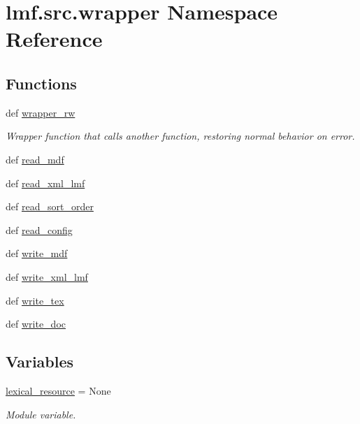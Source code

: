 \hypertarget{namespacelmf_1_1src_1_1wrapper}{\section{lmf.\+src.\+wrapper Namespace Reference}
\label{namespacelmf_1_1src_1_1wrapper}
}
\subsection*{Functions}
\begin{DoxyCompactItemize}
\item 
def \hyperlink{namespacelmf_1_1src_1_1wrapper_a3452144e50e7d9906a4fb68f16338147}{wrapper\+\_\+rw}
\begin{DoxyCompactList}\small\item\em Wrapper function that calls another function, restoring normal behavior on error. \end{DoxyCompactList}\item 
def \hyperlink{namespacelmf_1_1src_1_1wrapper_ac9330e43238a9e7374fec44248dccb9b}{read\+\_\+mdf}
\item 
def \hyperlink{namespacelmf_1_1src_1_1wrapper_a43689b5d5e59354412e8419b55cad753}{read\+\_\+xml\+\_\+lmf}
\item 
def \hyperlink{namespacelmf_1_1src_1_1wrapper_ae26ce96b85e0bd54d99d77674a330f08}{read\+\_\+sort\+\_\+order}
\item 
def \hyperlink{namespacelmf_1_1src_1_1wrapper_a8f281516c56b0837c0a0138ee87c4e7c}{read\+\_\+config}
\item 
def \hyperlink{namespacelmf_1_1src_1_1wrapper_a34eb45bde89039fab69e6f323c64b61b}{write\+\_\+mdf}
\item 
def \hyperlink{namespacelmf_1_1src_1_1wrapper_a21e10a1783a71a179ca395a1ffbf7124}{write\+\_\+xml\+\_\+lmf}
\item 
def \hyperlink{namespacelmf_1_1src_1_1wrapper_ac819224ea6166cfc937077700ec04fb2}{write\+\_\+tex}
\item 
def \hyperlink{namespacelmf_1_1src_1_1wrapper_aca592ed407c9bd88f27cd28d43c2ec47}{write\+\_\+doc}
\end{DoxyCompactItemize}
\subsection*{Variables}
\begin{DoxyCompactItemize}
\item 
\hyperlink{namespacelmf_1_1src_1_1wrapper_a0fd5d22005d5ad60acf8eb22acc51f8b}{lexical\+\_\+resource} = None
\begin{DoxyCompactList}\small\item\em Module variable. \end{DoxyCompactList}\end{DoxyCompactItemize}


